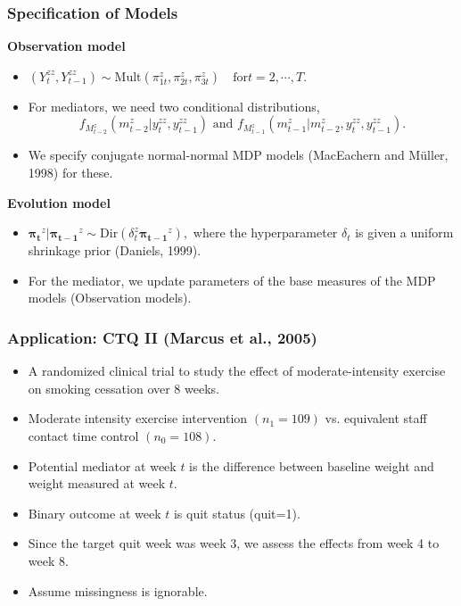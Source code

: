 \documentclass{beamer}
\begin{document}
\begin{frame}
\frametitle{Specification of Models}
{\bf Observation model}
\begin{itemize}
\item $(Y_t^{zz},Y_{t-1}^{zz}) \sim \text{Mult}(\pi_{1t}^z,\pi_{2t}^z,\pi_{3t}^z) \quad \text{for} t=2, \cdots, T.$
\item For mediators, we need two conditional distributions,
\[f_{M_{t-2}^z}(m_{t-2}^z|y_t^{zz}, y_{t-1}^{zz}) \text{ and } f_{M_{t-1}^z}(m_{t-1}^z|m_{t-2}^z,y_t^{zz}, y_{t-1}^{zz}).\]
\item We specify conjugate normal-normal MDP models (MacEachern and M\"uller, 1998) for these.
\end{itemize}
{\bf Evolution model}
\begin{itemize}
\item $\boldsymbol{\pi_t}^z | \boldsymbol{\pi_{t-1}}^z \sim \text{Dir}(\delta_t^z \boldsymbol{\pi_{t-1}}^z),$
where the hyperparameter $\delta_t$ is given a uniform shrinkage prior (Daniels, 1999).
\item For the mediator, we update parameters of the base measures of the MDP models (Observation models).
\end{itemize}
\end{frame}



\begin{frame}
\frametitle{Application: CTQ II (Marcus et al., 2005)}
\begin{itemize}
\item A randomized clinical trial to study the effect of moderate-intensity exercise on smoking cessation over 8 weeks.
\item Moderate intensity exercise intervention $(n_1=109)$ vs. equivalent staff contact time control $(n_0=108)$.
\item Potential {\color{red} mediator} at week $t$ is the difference between baseline weight and weight measured at week $t$.
\item {\color{red} Binary outcome} at week $t$ is quit status (quit=1).
\item Since the target quit week was week 3, we assess the effects from week 4 to week 8.
\item Assume missingness is ignorable.
\end{itemize}
\end{frame}
\end{document}
